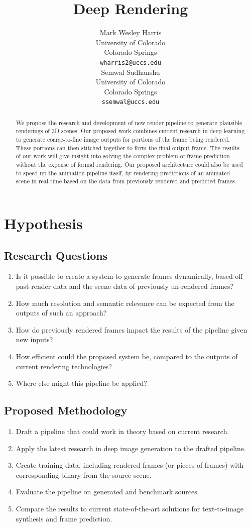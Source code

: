 \documentclass{article}
\title{Deep Rendering}
\author{Mark Wesley Harris\\
University of Colorado\\
Colorado Springs\\
\texttt{wharris2@uccs.edu} \\
\And
Semwal Sudhanshu\\
University of Colorado\\
Colorado Springs\\
\texttt{ssemwal@uccs.edu} \\
}
\begin{document}
\maketitle

\begin{abstract}
We propose the research and development of new render pipeline
to generate plausible renderings of 3D scenes.
Our proposed work combines current research in deep learning to generate
coarse-to-fine image outputs for portions of the frame being rendered.
These portions can then stitched together to form the final output frame.
The results of our work will give insight into solving the complex problem of
frame prediction without the expense of formal rendering.
Our proposed architecture could also be used to speed up
the animation pipeline itself, by rendering predictions of an animated
scene in real-time based on the data from previously rendered and predicted
frames.
\end{abstract}

\section{Hypothesis}
\label{sec:hypothesis}

\subsection{Research Questions}
\label{subsec:questions}
\begin{enumerate}
\item Is it possible to create a system to generate frames dynamically, based off
past render data and the scene data of previously un-rendered frames?
\item How much resolution and semantic relevance can be expected from the outputs
of such an approach?
\item How do previously rendered frames impact the results of the pipeline given
new inputs?
\item How efficient could the proposed system be, compared to the outputs of
current rendering technologies?
\item Where else might this pipeline be applied?
\end{enumerate}

\subsection{Proposed Methodology}
\label{sec:methodology}
\begin{enumerate}
\item Draft a pipeline that could work in theory based on current research.
\item Apply the latest research in deep image generation to the drafted pipeline.
\item Create training data, including rendered frames (or pieces of frames) with
corresponding binary from the source scene.
\item Evaluate the pipeline on generated and benchmark sources.
\item Compare the results to current state-of-the-art solutions for text-to-image
synthesis and frame prediction.
\end{enumerate}
\end{document}
